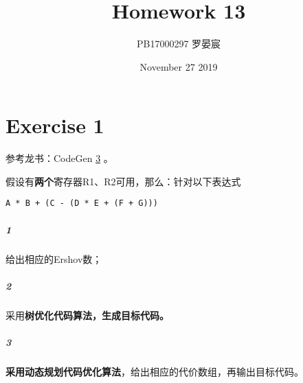 \documentclass{article}
\title{Homework 13}
\author{PB17000297 罗晏宸}
\date{November 27 2019}
\begin{document}
\maketitle

\section*{Exercise 1}
参考龙书：CodeGen \href{http://staff.ustc.edu.cn/~qlzheng/compiler/codegen3.ppt}{3} 。\par
假设有\textbf{两个}寄存器R1、R2可用，那么：针对以下表达式
\par
\centerline{\lstinline{A * B + (C - (D * E + (F + G)))}}
\subparagraph{1}
给出相应的Ershov数；
\subparagraph{2}
采用\textbf{树优化代码算法，生成目标代码。}
\subparagraph{3}
\textbf{采用动态规划代码优化算法}，给出相应的代价数组，再输出目标代码。
\end{document}
